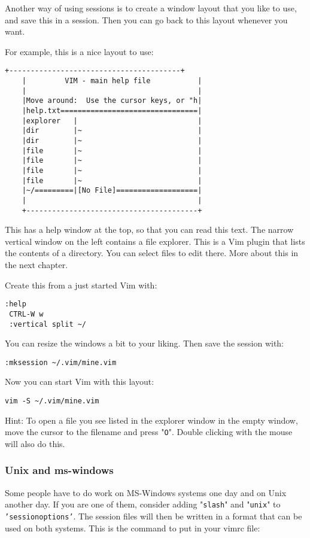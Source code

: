 {Another way of using sessions is to create a window layout that you like to use, and save this in a session.
Then you can go back to this layout whenever you want.

For example, this is a nice layout to use:

\begin{Verbatim}[samepage=true]
    +----------------------------------------+
    |         VIM - main help file           |
    |                                        |
    |Move around:  Use the cursor keys, or "h|
    |help.txt================================|
    |explorer   |                            |
    |dir        |~                           |
    |dir        |~                           |
    |file       |~                           |
    |file       |~                           |
    |file       |~                           |
    |file       |~                           |
    |~/=========|[No File]===================|
    |                                        |
    +----------------------------------------+
\end{Verbatim}

This has a help window at the top, so that you can read this text.
The narrow vertical window on the left contains a file explorer.
This is a Vim plugin that lists the contents of a directory.
You can select files to edit there.
More about this in the next chapter.

Create this from a just started Vim with:

\begin{Verbatim}[samepage=true]
 :help
 CTRL-W w
 :vertical split ~/
\end{Verbatim}

You can resize the windows a bit to your liking.
Then save the session with:

\begin{Verbatim}[samepage=true]
 :mksession ~/.vim/mine.vim
\end{Verbatim}

Now you can start Vim with this layout:

\begin{Verbatim}[samepage=true]
 vim -S ~/.vim/mine.vim
\end{Verbatim}

Hint: To open a file you see listed in the explorer window in the empty window, move the cursor to the filename and press "\texttt{O}".
Double clicking with the mouse will also do this.

\subsubsection{Unix and ms-windows}
Some people have to do work on MS-Windows systems one day and on Unix another day.
If you are one of them, consider adding "\texttt{slash}" and "\texttt{unix}" to \texttt{'sessionoptions'}.
The session files will then be written in a format that can be used on both systems.
This is the command to put in your vimrc file:

}

